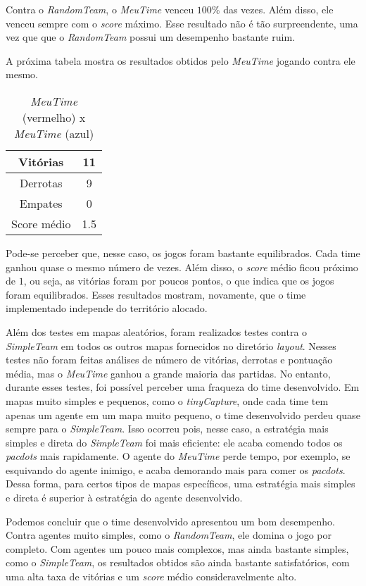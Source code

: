 \documentclass[a4paper,12pt]{article}
\begin{document}
Contra o \textit{RandomTeam}, o \textit{MeuTime} venceu $100\%$ das vezes. Além disso,
ele venceu sempre com o \textit{score} máximo. Esse resultado não é tão surpreendente,
uma vez que que o \textit{RandomTeam} possui um desempenho bastante ruim.

A próxima tabela mostra os resultados obtidos pelo \textit{MeuTime} jogando contra
ele mesmo.

\begin{table}[htb!]
    {\centering
    \begin{tabular}{|c|c|} \hline
    Vitórias     & 11  \\ \hline
    Derrotas     & 9   \\ \hline
    Empates      & 0   \\ \hline
    Score médio  & 1.5 \\ \hline
    \end{tabular}
    \caption{\textit{MeuTime} (vermelho) x \textit{MeuTime} (azul)}
    }
\end{table}

Pode-se perceber que, nesse caso, os jogos foram bastante equilibrados. Cada time ganhou quase o mesmo
número de vezes. Além disso, o \textit{score} médio ficou próximo de $1$, ou seja, as vitórias foram
por poucos pontos, o que indica que os jogos foram equilibrados. Esses resultados mostram, novamente,
que o time implementado independe do território alocado.

Além dos testes em mapas aleatórios, foram realizados testes contra o \textit{SimpleTeam} em
todos os outros mapas fornecidos no diretório \textit{layout}. Nesses testes não foram feitas
análises de número de vitórias, derrotas e pontuação média, mas o \textit{MeuTime} ganhou a grande
maioria das partidas. No entanto, durante esses testes, foi possível perceber uma fraqueza
do time desenvolvido. Em mapas muito simples e pequenos, como o \textit{tinyCapture}, onde cada
time tem apenas um agente em um mapa muito pequeno, o time desenvolvido perdeu quase sempre para
o \textit{SimpleTeam}. Isso ocorreu pois, nesse caso, a estratégia mais simples e direta do
\textit{SimpleTeam} foi mais eficiente: ele acaba comendo todos os \textit{pacdots} mais rapidamente.
O agente do \textit{MeuTime} perde tempo, por exemplo, se esquivando do agente inimigo, e acaba
demorando mais para comer os \textit{pacdots}. Dessa forma, para certos tipos de mapas específicos,
uma estratégia mais simples e direta é superior à estratégia do agente desenvolvido.

Podemos concluir que o time desenvolvido apresentou um bom desempenho. Contra agentes muito simples,
como o \textit{RandomTeam}, ele domina o jogo por completo. Com agentes um pouco mais complexos,
mas ainda bastante simples, como o \textit{SimpleTeam}, os resultados obtidos são ainda bastante
satisfatórios, com uma alta taxa de vitórias e um \textit{score} médio consideravelmente alto.
\end{document}
